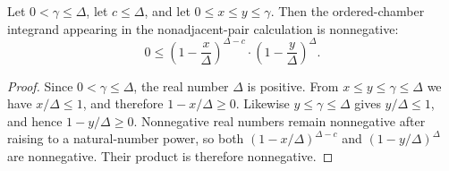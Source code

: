 \begin{helper}
Let \(0<\gamma\le \Delta\), let \(c\le\Delta\), and let
\(0\le x\le y\le \gamma\).  Then the ordered-chamber integrand appearing in
the nonadjacent-pair calculation is nonnegative:
\[
0\le
\left(1-\frac{x}{\Delta}\right)^{\Delta-c}
\cdot
\left(1-\frac{y}{\Delta}\right)^\Delta .
\]
\end{helper}
\begin{proof}
Since \(0<\gamma\le \Delta\), the real number \(\Delta\) is positive.  From
\(x\le y\le\gamma\le\Delta\) we have \(x/\Delta\le1\), and therefore
\(1-x/\Delta\ge0\).  Likewise \(y\le\gamma\le\Delta\) gives
\(y/\Delta\le1\), and hence \(1-y/\Delta\ge0\).  Nonnegative real numbers
remain nonnegative after raising to a natural-number power, so both
\((1-x/\Delta)^{\Delta-c}\) and \((1-y/\Delta)^\Delta\) are nonnegative.
Their product is therefore nonnegative.
\end{proof}

